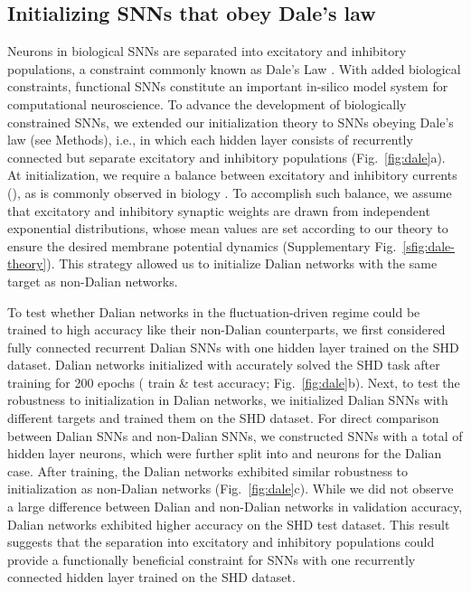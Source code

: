\documentclass[11pt,a4paper]{article}
\begin{document}
\subsection*{Initializing \acp{SNN} that obey Dale's law}
Neurons in biological \acp{SNN} are separated into excitatory and inhibitory populations, a constraint commonly known as Dale's Law \citep{Eccles1954-td}. 
With added biological constraints, functional \acp{SNN} constitute an important in-silico model system for computational neuroscience.
To advance the development of biologically constrained \acp{SNN}, we extended our initialization theory to \acp{SNN} obeying Dale's law (see Methods), i.e., in which each hidden layer consists of recurrently connected but separate excitatory and inhibitory populations (Fig.~\ref{fig:dale}a). 
At initialization, we require a balance between excitatory and inhibitory currents (), as is commonly observed in biology \cite{Rupprecht2018-sl,Spiegel2014-ra}.
To accomplish such balance, we assume that excitatory and inhibitory synaptic weights are drawn from independent exponential distributions, whose mean values are set according to our theory to ensure the desired membrane potential dynamics (Supplementary Fig.~\ref{sfig:dale-theory}).
This strategy allowed us to initialize Dalian networks with the same target  as non-Dalian networks.

To test whether Dalian networks in the fluctuation-driven regime could be trained to high accuracy like their non-Dalian counterparts, we first considered fully connected recurrent Dalian \acp{SNN} with one hidden layer trained on the SHD dataset.
Dalian networks initialized with  accurately solved the SHD task after training for 200 epochs ( train \&  test accuracy; Fig.~\ref{fig:dale}b). 
Next, to test the robustness to initialization in Dalian networks, we initialized Dalian \acp{SNN} with different targets  and trained them on the SHD dataset.
For direct comparison between Dalian \acp{SNN} and non-Dalian \acp{SNN}, we constructed \acp{SNN} with a total of  hidden layer neurons, which were further split into  and  neurons for the Dalian case.
After training, the Dalian networks exhibited similar robustness to initialization as non-Dalian networks (Fig.~\ref{fig:dale}c).
While we did not observe a large difference between Dalian and non-Dalian networks in validation accuracy, Dalian networks exhibited higher accuracy on the SHD test dataset.
This result suggests that the separation into excitatory and inhibitory populations could provide a functionally beneficial constraint for \acp{SNN} with one recurrently connected hidden layer trained on the SHD dataset.
\end{document}
